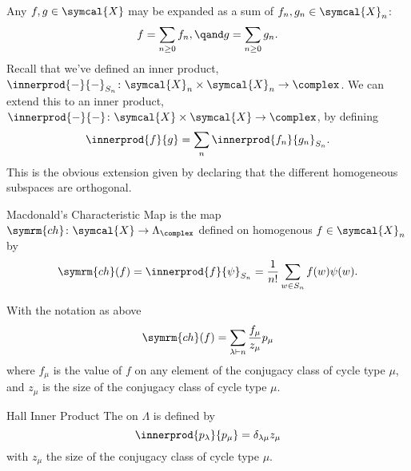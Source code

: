 \documentclass[fleqn]{NotesClass}
\newcommand{\classFunctions}{\symcal{X}}
\newcommand{\partition}{\vdash}
\newcommand{\ch}{\symrm{ch}}
\begin{document}
    Any \(f, g \in \classFunctions\) may be expanded as a sum of \(f_n, g_n \in \classFunctions_n\):
    \begin{equation}
        f = \sum_{n \ge 0} f_n, \qand g = \sum_{n \ge 0} g_n.
    \end{equation}
    Recall that we've defined an inner product, \(\innerprod{-}{-}_{S_n} \colon \classFunctions_n \times \classFunctions_n \to \complex\).
    We can extend this to an inner product, \(\innerprod{-}{-} \colon \classFunctions \times \classFunctions \to \complex\), by defining
    \begin{equation}
        \innerprod{f}{g} = \sum_n \innerprod{f_n}{g_n}_{S_n}.
    \end{equation}
    This is the obvious extension given by declaring that the different homogeneous subspaces are orthogonal.
    
    \begin{dfn}{Macdonald's Characteristic Map}{}
         is the map \(\ch \colon \classFunctions \to \Lambda_{\complex}\) defined on homogenous \(f \in \classFunctions_n\) by
        \begin{equation}
            \ch(f) = \innerprod{f}{\psi}_{S_n} = \frac{1}{n!} \sum_{w \in S_n} f(w)\psi(w).
        \end{equation}
    \end{dfn}
    
    \begin{lma}{}{}
        With the notation as above
        \begin{equation}
            \ch(f) = \sum_{\lambda \partition n} \frac{f_\mu}{z_\mu} p_\mu
        \end{equation}
        where \(f_\mu\) is the value of \(f\) on any element of the conjugacy class of cycle type \(\mu\), and \(z_\mu\) is the size of the conjugacy class of cycle type \(\mu\).
    \end{lma}
    
    \begin{dfn}{Hall Inner Product}{}
        The  on \(\Lambda\) is defined by
        \begin{equation}
            \innerprod{p_\lambda}{p_\mu} = \delta_{\lambda\mu} z_\mu
        \end{equation}
        with \(z_\mu\) the size of the conjugacy class of cycle type \(\mu\).
    \end{dfn}
    
\end{document}
